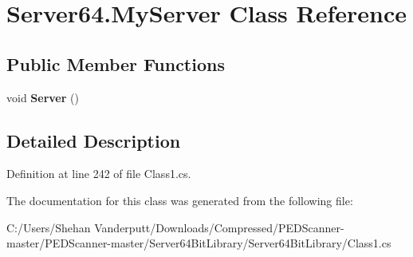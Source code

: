 \hypertarget{class_server64_1_1_my_server}{}\section{Server64.\+My\+Server Class Reference}
\label{class_server64_1_1_my_server}
\subsection*{Public Member Functions}
\begin{DoxyCompactItemize}
\item 
\mbox{\label{class_server64_1_1_my_server_ab3bf5d76d07698a64cd2edfd4a541ddb}} 
void {\bfseries Server} ()
\end{DoxyCompactItemize}


\subsection{Detailed Description}


Definition at line 242 of file Class1.\+cs.



The documentation for this class was generated from the following file\+:\begin{DoxyCompactItemize}
\item 
C\+:/\+Users/\+Shehan Vanderputt/\+Downloads/\+Compressed/\+P\+E\+D\+Scanner-\/master/\+P\+E\+D\+Scanner-\/master/\+Server64\+Bit\+Library/\+Server64\+Bit\+Library/Class1.\+cs\end{DoxyCompactItemize}
